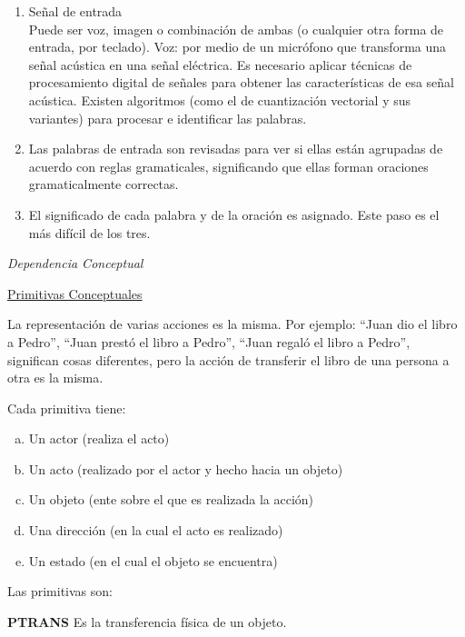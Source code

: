 \begin{enumerate}[1.]
	\item Señal de entrada \\
	Puede ser voz, imagen o combinación de ambas (o cualquier otra forma de entrada, por teclado).
	Voz: por medio de un micrófono que transforma una señal acústica en una señal eléctrica.
	Es necesario aplicar técnicas de procesamiento digital de señales para obtener las características de
	esa señal acústica.
	Existen algoritmos (como el de cuantización vectorial y sus variantes) para procesar e identificar las
	palabras.
	
	\item Las palabras de entrada son revisadas para ver si ellas están agrupadas de acuerdo con reglas
	gramaticales, significando que ellas forman oraciones gramaticalmente correctas.
	
	\item El significado de cada palabra y de la oración es asignado.
	Este paso es el más difícil de los tres.
	
\end{enumerate}



\textit{Dependencia Conceptual}

\underline{Primitivas Conceptuales}

La representación de varias acciones es la misma.
Por ejemplo: “Juan dio el libro a Pedro”, “Juan prestó el libro a Pedro”, “Juan regaló el libro a Pedro”,
significan cosas diferentes, pero la acción de transferir el libro de una persona a otra es la misma.

Cada primitiva tiene:

\begin{enumerate}[a)]
	\item Un actor (realiza el acto)
	\item Un acto (realizado por el actor y hecho hacia un objeto)
	\item Un objeto (ente sobre el que es realizada la acción)
	\item Una dirección (en la cual el acto es realizado)
	\item Un estado (en el cual el objeto se encuentra)
\end{enumerate}

Las primitivas son:

\textbf{PTRANS} \hspace{0.5cm}
Es la transferencia física de un objeto. \\

